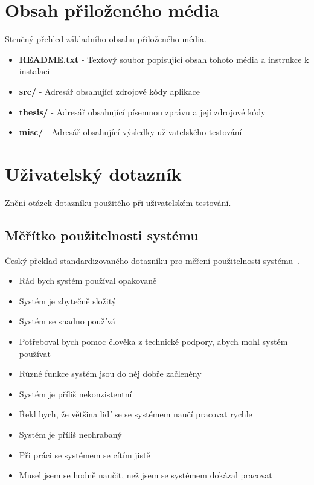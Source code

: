 \chapter{Obsah přiloženého média}
Stručný přehled základního obsahu přiloženého média.

\begin{itemize}
\item \textbf{README.txt} - Textový soubor popisující obsah tohoto média a instrukce k instalaci
\item \textbf{src/} - Adresář obsahující zdrojové kódy aplikace
\item \textbf{thesis/} - Adresář obsahující písemnou zprávu a její zdrojové kódy
\item \textbf{misc/} - Adresář obsahující výsledky uživatelského testování
\end{itemize}



\chapter{Uživatelský dotazník}\label{sec:questionarre}
Znění otázek dotazníku použitého při uživatelském testování.

\section{Měřítko použitelnosti systému}
Český překlad standardizovaného dotazníku pro měření použitelnosti systému~\cite{bib:sus-cz}.

\begin{itemize}
  \item Rád bych systém používal opakovaně
  \item Systém je zbytečně složitý
  \item Systém se snadno používá
  \item Potřeboval bych pomoc člověka z technické podpory, abych mohl systém používat
  \item Různé funkce systém jsou do něj dobře začleněny
  \item Systém je příliš nekonzistentní
  \item Řekl bych, že většina lidí se se systémem naučí pracovat rychle
  \item Systém je příliš neohrabaný
  \item Při práci se systémem se cítím jistě
  \item Musel jsem se hodně naučit, než jsem se systémem dokázal pracovat
\end{itemize}

